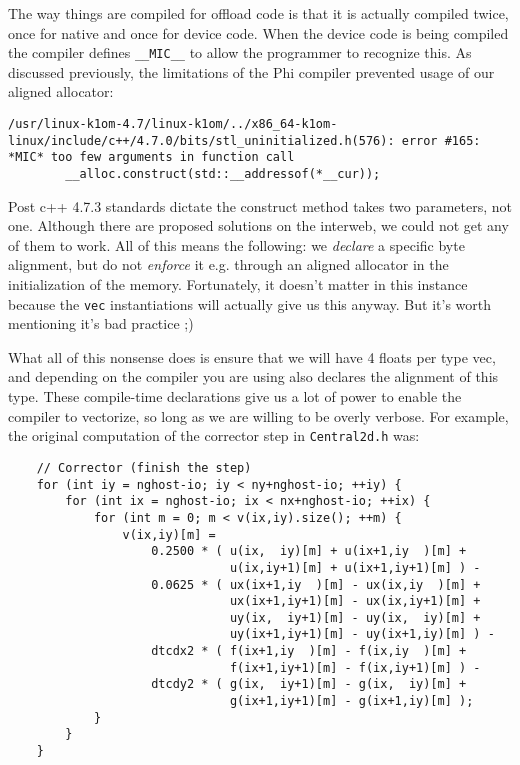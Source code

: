 The way things are compiled for offload code is that it is actually compiled twice, once for native and once for device code.  When the device code is being compiled the compiler defines \texttt{\_\_MIC\_\_} to allow the programmer to recognize this.  As discussed previously, the limitations of the Phi compiler prevented usage of our aligned allocator:

{\tiny
\begin{lstlisting}
/usr/linux-k1om-4.7/linux-k1om/../x86_64-k1om-linux/include/c++/4.7.0/bits/stl_uninitialized.h(576): error #165: *MIC* too few arguments in function call
        __alloc.construct(std::__addressof(*__cur));   
\end{lstlisting}
}

Post c++ 4.7.3 standards dictate the construct method takes two parameters, not one.  Although there are proposed solutions on the interweb, we could not get any of them to work.  All of this means the following: we \emph{declare} a specific byte alignment, but do not \emph{enforce} it e.g. through an aligned allocator in the initialization of the memory.  Fortunately, it doesn't matter in this instance because the \texttt{vec} instantiations will actually give us this anyway.  But it's worth mentioning it's bad practice ;)

What all of this nonsense does is ensure that we will have 4 floats per type vec, and depending on the compiler you are using also declares the alignment of this type.  These compile-time declarations give us a lot of power to enable the compiler to vectorize, so long as we are willing to be overly verbose.  For example, the original computation of the corrector step in \texttt{Central2d.h} was:
{\tiny
\begin{lstlisting}
    // Corrector (finish the step)
    for (int iy = nghost-io; iy < ny+nghost-io; ++iy) {
        for (int ix = nghost-io; ix < nx+nghost-io; ++ix) {
            for (int m = 0; m < v(ix,iy).size(); ++m) {
                v(ix,iy)[m] =
                    0.2500 * ( u(ix,  iy)[m] + u(ix+1,iy  )[m] +
                               u(ix,iy+1)[m] + u(ix+1,iy+1)[m] ) -
                    0.0625 * ( ux(ix+1,iy  )[m] - ux(ix,iy  )[m] +
                               ux(ix+1,iy+1)[m] - ux(ix,iy+1)[m] +
                               uy(ix,  iy+1)[m] - uy(ix,  iy)[m] +
                               uy(ix+1,iy+1)[m] - uy(ix+1,iy)[m] ) -
                    dtcdx2 * ( f(ix+1,iy  )[m] - f(ix,iy  )[m] +
                               f(ix+1,iy+1)[m] - f(ix,iy+1)[m] ) -
                    dtcdy2 * ( g(ix,  iy+1)[m] - g(ix,  iy)[m] +
                               g(ix+1,iy+1)[m] - g(ix+1,iy)[m] );
            }
        }
    }
\end{lstlisting}
}

